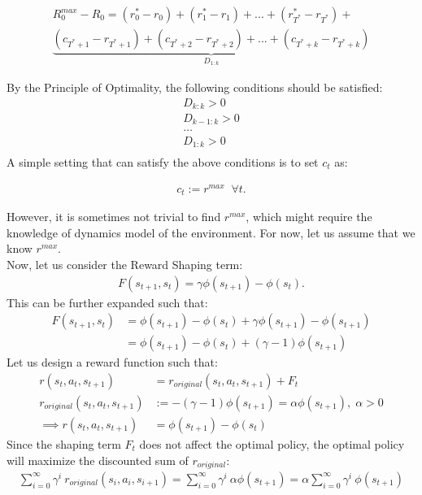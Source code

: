 \documentclass[12pt]{article}
\begin{document}
\begin{align*}
R_0^{max} - R_0 = (r_0^{*} - r_0) + (r_1^{*} - r_1) + ... + (r_{T^*}^{*} - r_{T^*}) + \\
\underbrace{(c_{T^{*}+1} - r_{T^{*}+1}) + (c_{T^{*}+2} - r_{T^{*}+2}) 
	+ ... + (c_{T^{*}+k} - r_{T^{*}+k})}_{ D_{1:k} }
\end{align*}

By the Principle of Optimality, the following conditions should be satisfied:
\begin{align*}
D_{k:k} > 0 \\
D_{k-1:k} > 0 \\
\ldots \\
D_{1:k} > 0 \\
\end{align*}
A simple setting that can satisfy the above conditions is to set $c_t$ as:

\begin{align*}
c_t := r^{max} \;\; \forall t.
\end{align*}

\noindent However, it is sometimes not trivial to find $r^{max}$, which might require the knowledge of dynamics model of the environment. For now, let us assume that we know $r^{max}$. 
\\

\noindent Now, let us consider the Reward Shaping term:
\begin{align*}
F(s_{t+1}, s_t) = \gamma \phi(s_{t+1}) - \phi(s_{t}). 
\end{align*}
\noindent This can be further expanded such that:
\begin{align*}
F(s_{t+1}, s_t) &= \phi(s_{t+1}) - \phi(s_{t}) + \gamma \phi(s_{t+1}) - \phi(s_{t+1}) \\
&= \phi(s_{t+1}) - \phi(s_{t}) + (\gamma - 1) \phi(s_{t+1})
\end{align*}
Let us design a reward function such that:
\begin{align*}
r(s_t, a_t, s_{t+1}) &= r_{original}(s_t, a_t, s_{t+1}) + F_t \\
r_{original}(s_t, a_t, s_{t+1}) &:= -(\gamma - 1) \phi(s_{t+1}) = \alpha \phi(s_{t+1}), \; \alpha > 0 \\
\implies r(s_t, a_t, s_{t+1}) &= \phi(s_{t+1}) - \phi(s_{t})
\end{align*}
Since the shaping term $F_t$ does not affect the optimal policy, the optimal policy will maximize the discounted sum of $r_{original}$:
\begin{align*}
\sum_{i=0}^{\infty} \gamma^i \: r_{original}(s_i, a_i, s_{i+1}) = \sum_{i=0}^{\infty} \gamma^i \: \alpha \phi(s_{t+1}) = \alpha \sum_{i=0}^{\infty} \gamma^i \: \phi(s_{t+1})
\end{align*}
\end{document}
